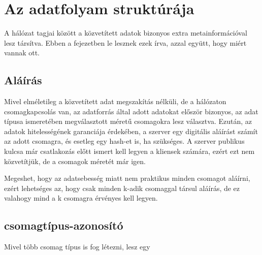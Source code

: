 \chapter{Az adatfolyam struktúrája}

A hálózat tagjai között a közvetített adatok bizonyos extra
metainformációval lesz társítva. Ebben a fejezetben le lesznek ezek írva,
azzal együtt, hogy miért vannak ott.

\section{Aláírás}

Mivel elméletileg a közvetített adat megszakítás nélküli, de a hálózaton
csomagkapcsolás van, az adatforrás által adott adatokat először bizonyos,
az adat típusa ismeretében megválasztott méretű csomagokra lesz választva.
Ezután, az adatok hitelességének garanciája érdekében, a szerver egy
digitális aláírást számít az adott csomagra, és esetleg egy hash-et is,
ha szükséges. A szerver publikus kulcsa már csatlakozás előtt ismert kell
legyen a kliensek számára, ezért ezt nem közvetítjük, de a csomagok
méretét már igen.

Megeshet, hogy az adatsebesség miatt nem praktikus minden csomagot
aláírni, ezért lehetséges az, hogy csak minden k-adik csomaggal társul
aláírás, de ez valahogy mind a k csomagra érvényes kell legyen.

\section{csomagtípus-azonosító}

Mivel
több csomag típus is fog létezni, lesz egy 

